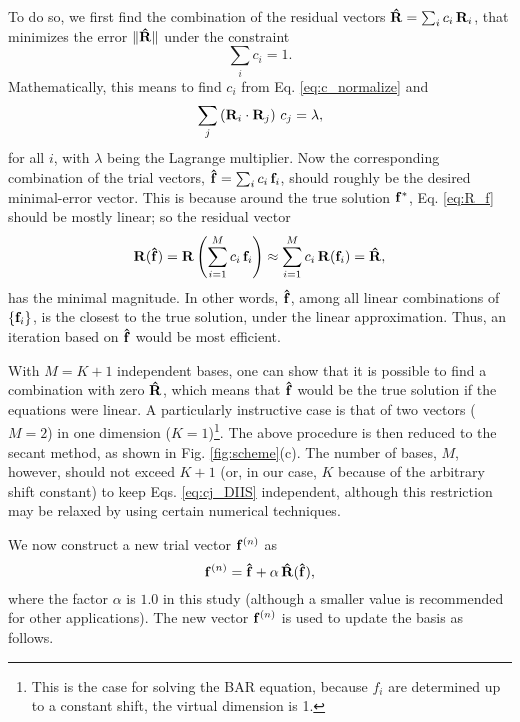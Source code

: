 \documentclass[reprint,aip,jcp,superscriptaddress]{revtex4-1}
\begin{document}
To do so, we first find the combination of the residual vectors
$\mathbf{\hat R} = \sum_i c_i \, \mathbf{R}_i$,
that minimizes the error
$\| \mathbf{\hat R} \|$
under the constraint
\begin{equation}
  \sum_i c_i = 1.
  \label{eq:c_normalize}
\end{equation}
%
Mathematically,
this means to find $c_i$
from Eq. \eqref{eq:c_normalize} and
%
\begin{equation}
  \sum_j \left( \mathbf{R}_i \cdot \mathbf{R}_j \right) \, c_j = \lambda,
  \label{eq:cj_DIIS}
\end{equation}
%
for all $i$,
with $\lambda$ being the Lagrange multiplier.
%
Now the corresponding combination
of the trial vectors,
$\mathbf{\hat f} = \sum_i c_i \, \mathbf{f}_i$,
should roughly be the desired minimal-error vector.
%
This is because
around the true solution $\mathbf{f}^*$,
Eq. \eqref{eq:R_f} should be mostly linear;
so the residual vector
%
\[
\mathbf{R}(\mathbf{\hat f})
=
\mathbf{R}\left(
  \sum_{i=1}^M c_i \, \mathbf{f}_i
\right)
\approx
\sum_{i=1}^M c_i \, \mathbf{R}(\mathbf{f}_i)
=\mathbf{\hat R},
\]
%
has the minimal magnitude.
%
In other words,
$\mathbf{\hat f}$,
among all linear combinations of $\{ \mathbf{f}_i \}$,
is the closest to the true solution,
under the linear approximation.
%
Thus,
an iteration based on
$\mathbf{\hat f}$
would be most efficient.



With $M = K + 1$ independent bases,
one can show that
it is possible to
find a combination with zero $\mathbf{\hat R}$,
which means that
$\mathbf{\hat f}$ would be the true solution
if the equations were linear.
%
A particularly instructive case is that of
two vectors ($M = 2$)
in one dimension ($K = 1$)\footnote{
This is the case for solving the BAR equation,
because $f_i$ are determined up to a constant shift,
the virtual dimension is 1.}.
%
The above procedure
is then reduced to the secant method\cite{press},
as shown in Fig. \ref{fig:scheme}(c).
%
The number of bases, $M$, however,
should not exceed $K + 1$
(or, in our case, $K$
because of the arbitrary shift constant)
to keep Eqs. \eqref{eq:cj_DIIS}
independent,
%
although this restriction may be relaxed
by using certain numerical techniques\cite{
press}.




We now construct a new trial vector $\mathbf{f}^{(n)}$ as
%
\begin{equation*}
\mathbf{f}^{(n)}
=
\mathbf{\hat f}
+
\alpha \, \mathbf{\hat R}( \mathbf{\hat f} ),
\end{equation*}
%
where the factor $\alpha$ is $1.0$ in this study
(although a smaller value is recommended
for other applications\cite{kovalenko1999, howard2011}).
%
The new vector $\mathbf{f}^{(n)}$
is used to update the basis as follows.
\end{document}
